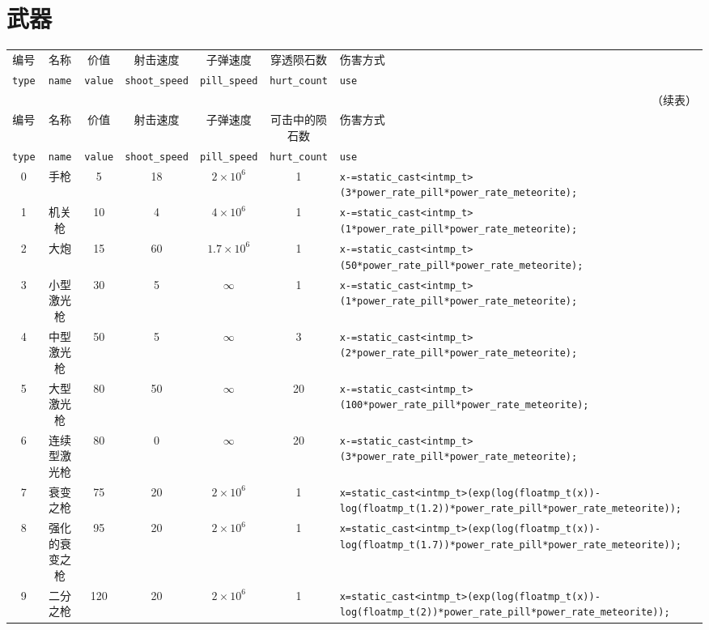 \documentclass[UTF8,fontset=none,linespread=1.2]{ctexart}
\begin{document}
\section{武器}
\begin{center}
\begin{longtable}{|c|c|c|c|c|c|>{\centering\arraybackslash}m{10cm}|}
\hline
编号&名称&价值&射击速度&子弹速度&穿透陨石数&伤害方式\\
\lstinline|type|&\lstinline|name|&\lstinline|value|&\lstinline|shoot_speed|&\lstinline|pill_speed|&\lstinline|hurt_count|&\lstinline|use|\\\hline
\endfirsthead
\multicolumn{7}{r}{（续表）}\\\hline
编号&名称&价值&射击速度&子弹速度&可击中的陨石数&伤害方式\\
\lstinline|type|&\lstinline|name|&\lstinline|value|&\lstinline|shoot_speed|&\lstinline|pill_speed|&\lstinline|hurt_count|&\lstinline|use|\\\hline
\endhead
0&手枪&5&18&$2\times10^6$&1&\lstinline|x-=static_cast<intmp_t>(3*power_rate_pill*power_rate_meteorite);|\\\hline
1&机关枪&10&4&$4\times10^6$&1&\lstinline|x-=static_cast<intmp_t>(1*power_rate_pill*power_rate_meteorite);|\\\hline
2&大炮&15&60&$1.7\times10^6$&1&\lstinline|x-=static_cast<intmp_t>(50*power_rate_pill*power_rate_meteorite);|\\\hline
3&小型激光枪&30&5&$\infty$&1&\lstinline|x-=static_cast<intmp_t>(1*power_rate_pill*power_rate_meteorite);|\\\hline
4&中型激光枪&50&5&$\infty$&3&\lstinline|x-=static_cast<intmp_t>(2*power_rate_pill*power_rate_meteorite);|\\\hline
5&大型激光枪&80&50&$\infty$&20&\lstinline|x-=static_cast<intmp_t>(100*power_rate_pill*power_rate_meteorite);|\\\hline
6&连续型激光枪&80&0&$\infty$&20&\lstinline|x-=static_cast<intmp_t>(3*power_rate_pill*power_rate_meteorite);|\\\hline
7&衰变之枪&75&20&$2\times10^6$&1&\lstinline|x=static_cast<intmp_t>(exp(log(floatmp_t(x))-log(floatmp_t(1.2))*power_rate_pill*power_rate_meteorite));|\\\hline
8&强化的衰变之枪&95&20&$2\times10^6$&1&\lstinline|x=static_cast<intmp_t>(exp(log(floatmp_t(x))-log(floatmp_t(1.7))*power_rate_pill*power_rate_meteorite));|\\\hline
9&二分之枪&120&20&$2\times10^6$&1&\lstinline|x=static_cast<intmp_t>(exp(log(floatmp_t(x))-log(floatmp_t(2))*power_rate_pill*power_rate_meteorite));|\\\hline

\end{longtable}
\end{center}
\end{document}

